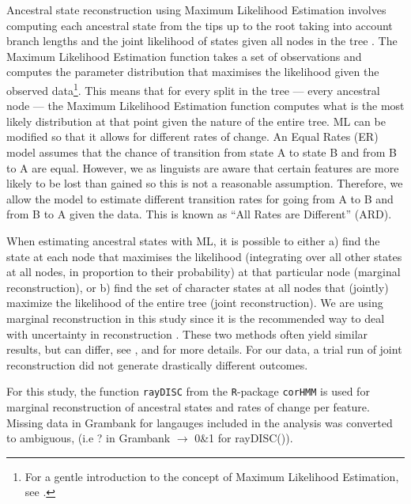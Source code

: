 \documentclass[a4paper,10pt]{article} %
\begin{document}
Ancestral state reconstruction using Maximum Likelihood Estimation involves computing each ancestral state from the tips up to the root taking into account branch lengths and the joint likelihood of states given all nodes in the tree \citep{wilks1938large, fisher1912absolute, pagel1994detecting, cunningham1998reconstructing}. The Maximum Likelihood Estimation function takes a set of observations and computes the parameter distribution that maximises the likelihood given the observed data\footnote{For a gentle introduction to the concept of Maximum Likelihood Estimation, see \citet{jonny_ML}.}. This means that for every split in the tree --- every ancestral node --- the Maximum Likelihood Estimation function computes what is the most likely distribution at that point given the nature of the entire tree. ML can be modified so that it allows for different rates of change. An Equal Rates (ER) model assumes that the chance of transition from state A to state B and from B to A are equal. However, we as linguists are aware that certain features are more likely to be lost than gained so this is not a reasonable assumption. Therefore, we allow the model to estimate different transition rates for going from A to B and from B to A given the data. This is known as ``All Rates are Different'' (ARD).

When estimating ancestral states with ML, it is possible to either a) find the state at each node that maximises the likelihood (integrating over all other states at all nodes, in proportion to their probability) at that particular node (marginal reconstruction), or b) find the set of character states at all nodes that (jointly) maximize the likelihood of the entire tree (joint reconstruction). We are using marginal reconstruction in this study since it is the recommended way to deal with uncertainty in reconstruction \citep{revell_2014}. These two methods often yield similar results, but can differ, see \citet[259-260]{felsenstein2004inferring},  \citet[121-126]{yang2006computational} and \citet[5]{joy2016ancestral} for more details. For our data, a trial run of joint reconstruction did not generate drastically different outcomes.

For this study, the function \texttt{rayDISC} from the \texttt{R}-package \texttt{corHMM} \citep{corHMM} is used for marginal reconstruction of ancestral states and rates of change per feature. Missing data in Grambank for langauges included in the analysis was converted to ambiguous, (i.e ? in Grambank $\rightarrow$ 0\&1 for rayDISC()). 
\end{document}

